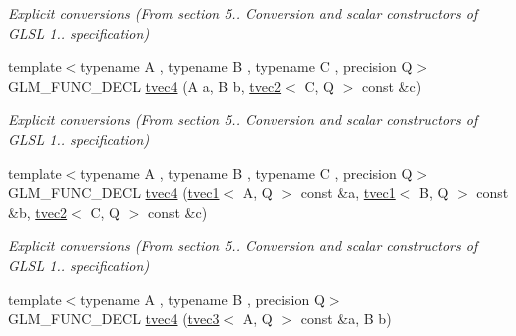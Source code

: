 \begin{DoxyCompactItemize}
\begin{DoxyCompactList}\small\item\em Explicit conversions (From section 5.. Conversion and scalar constructors of G\-L\-S\-L 1.. specification) \end{DoxyCompactList}\item 
\hypertarget{structglm_1_1tvec4_a6d99cabfbf3a3ee98155237a31afb5dd}{{\footnotesize template$<$typename A , typename B , typename C , precision Q$>$ }\\G\-L\-M\-\_\-\-F\-U\-N\-C\-\_\-\-D\-E\-C\-L \hyperlink{structglm_1_1tvec4_a6d99cabfbf3a3ee98155237a31afb5dd}{tvec4} (A a, B b, \hyperlink{structglm_1_1tvec2}{tvec2}$<$ C, Q $>$ const \&c)}\label{structglm_1_1tvec4_a6d99cabfbf3a3ee98155237a31afb5dd}

\begin{DoxyCompactList}\small\item\em Explicit conversions (From section 5.. Conversion and scalar constructors of G\-L\-S\-L 1.. specification) \end{DoxyCompactList}\item 
\hypertarget{structglm_1_1tvec4_a9c5004ffc426497793b3a10b2b5b7247}{{\footnotesize template$<$typename A , typename B , typename C , precision Q$>$ }\\G\-L\-M\-\_\-\-F\-U\-N\-C\-\_\-\-D\-E\-C\-L \hyperlink{structglm_1_1tvec4_a9c5004ffc426497793b3a10b2b5b7247}{tvec4} (\hyperlink{structglm_1_1tvec1}{tvec1}$<$ A, Q $>$ const \&a, \hyperlink{structglm_1_1tvec1}{tvec1}$<$ B, Q $>$ const \&b, \hyperlink{structglm_1_1tvec2}{tvec2}$<$ C, Q $>$ const \&c)}\label{structglm_1_1tvec4_a9c5004ffc426497793b3a10b2b5b7247}

\begin{DoxyCompactList}\small\item\em Explicit conversions (From section 5.. Conversion and scalar constructors of G\-L\-S\-L 1.. specification) \end{DoxyCompactList}\item 
\hypertarget{structglm_1_1tvec4_a58a0169bac9b3b99a76599cba964264d}{{\footnotesize template$<$typename A , typename B , precision Q$>$ }\\G\-L\-M\-\_\-\-F\-U\-N\-C\-\_\-\-D\-E\-C\-L \hyperlink{structglm_1_1tvec4_a58a0169bac9b3b99a76599cba964264d}{tvec4} (\hyperlink{structglm_1_1tvec3}{tvec3}$<$ A, Q $>$ const \&a, B b)}\label{structglm_1_1tvec4_a58a0169bac9b3b99a76599cba964264d}


\end{DoxyCompactItemize}
